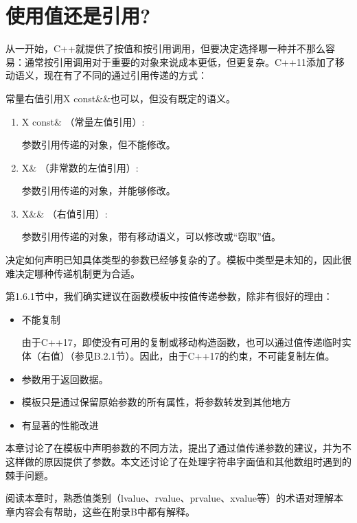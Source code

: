 \chapter{使用值还是引用?}
从一开始，C++就提供了按值和按引用调用，但要决定选择哪一种并不那么容易：通常按引用调用对于重要的对象来说成本更低，但更复杂。C++11添加了移动语义，现在有了不同的通过引用传递的方式：

\begin{notice}
常量右值引用X const\&\&也可以，但没有既定的语义。
\end{notice}

\begin{enumerate}
\item 
X const\& （常量左值引用）:

参数引用传递的对象，但不能修改。

\item 
X\& （非常数的左值引用）:

参数引用传递的对象，并能够修改。

\item 
X\&\& （右值引用）:

参数引用传递的对象，带有移动语义，可以修改或“窃取”值。
\end{enumerate}

决定如何声明已知具体类型的参数已经够复杂的了。模板中类型是未知的，因此很难决定哪种传递机制更为合适。

第1.6.1节中，我们确实建议在函数模板中按值传递参数，除非有很好的理由：

\begin{itemize}
\item 
不能复制

\begin{notice}
由于C++17，即使没有可用的复制或移动构造函数，也可以通过值传递临时实体（右值）（参见B.2.1节）。因此，由于C++17的约束，不可能复制左值。
\end{notice}

\item 
参数用于返回数据。

\item 
模板只是通过保留原始参数的所有属性，将参数转发到其他地方

\item 
有显著的性能改进
\end{itemize}

本章讨论了在模板中声明参数的不同方法，提出了通过值传递参数的建议，并为不这样做的原因提供了参数。本文还讨论了在处理字符串字面值和其他数组时遇到的棘手问题。

阅读本章时，熟悉值类别（lvalue、rvalue、prvalue、xvalue等）的术语对理解本章内容会有帮助，这些在附录B中都有解释。




































